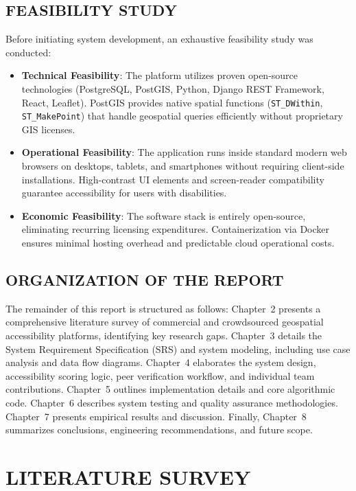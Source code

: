\documentclass[12pt,a4paper]{report}
\begin{document}
\section{FEASIBILITY STUDY}
Before initiating system development, an exhaustive feasibility study was conducted:
\begin{itemize}
    \item \textbf{Technical Feasibility}: The platform utilizes proven open-source technologies (PostgreSQL, PostGIS, Python, Django REST Framework, React, Leaflet). PostGIS provides native spatial functions (\texttt{ST\_DWithin}, \texttt{ST\_MakePoint}) that handle geospatial queries efficiently without proprietary GIS licenses.
    \item \textbf{Operational Feasibility}: The application runs inside standard modern web browsers on desktops, tablets, and smartphones without requiring client-side installations. High-contrast UI elements and screen-reader compatibility guarantee accessibility for users with disabilities.
    \item \textbf{Economic Feasibility}: The software stack is entirely open-source, eliminating recurring licensing expenditures. Containerization via Docker ensures minimal hosting overhead and predictable cloud operational costs.
\end{itemize}

\section{ORGANIZATION OF THE REPORT}
The remainder of this report is structured as follows: Chapter~2 presents a comprehensive literature survey of commercial and crowdsourced geospatial accessibility platforms, identifying key research gaps. Chapter~3 details the System Requirement Specification (SRS) and system modeling, including use case analysis and data flow diagrams. Chapter~4 elaborates the system design, accessibility scoring logic, peer verification workflow, and individual team contributions. Chapter~5 outlines implementation details and core algorithmic code. Chapter~6 describes system testing and quality assurance methodologies. Chapter~7 presents empirical results and discussion. Finally, Chapter~8 summarizes conclusions, engineering recommendations, and future scope.

\newpage
\chapter{LITERATURE SURVEY}
\end{document}
